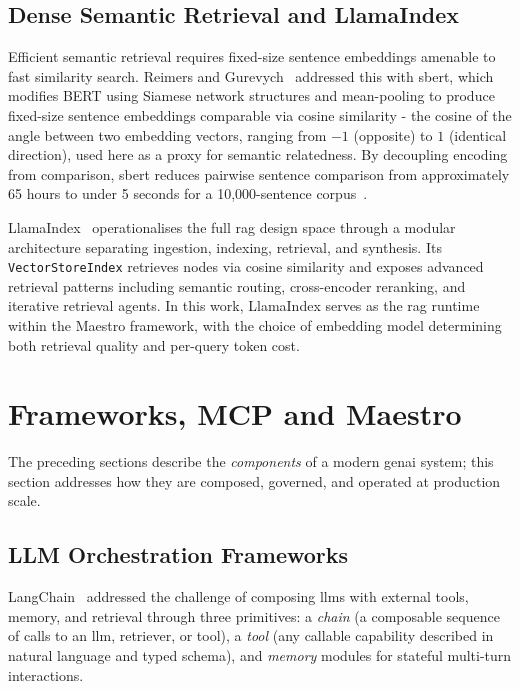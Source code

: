 \subsection{Dense Semantic Retrieval and LlamaIndex}
\label{subsec:sbert}

Efficient semantic retrieval requires fixed-size sentence embeddings amenable to fast similarity search. Reimers and Gurevych~\cite{reimers2019sbert} addressed this with \acrfull{sbert}, which modifies BERT using Siamese network structures and mean-pooling to produce fixed-size sentence embeddings comparable via cosine similarity - the cosine of the angle between two embedding vectors, ranging from $-1$ (opposite) to $1$ (identical direction), used here as a proxy for semantic relatedness. By decoupling encoding from comparison, \gls{sbert} reduces pairwise sentence comparison from approximately 65 hours to under 5 seconds for a 10,000-sentence corpus~\cite{reimers2019sbert}.

LlamaIndex~\cite{liu2022llamaindex} operationalises the full \gls{rag} design space through a modular architecture separating ingestion, indexing, retrieval, and synthesis. Its \texttt{VectorStoreIndex} retrieves nodes via cosine similarity and exposes advanced retrieval patterns including semantic routing, cross-encoder reranking, and iterative retrieval agents. In this work, LlamaIndex serves as the \gls{rag} runtime within the Maestro framework, with the choice of embedding model determining both retrieval quality and per-query token cost.

\section{Frameworks, MCP and Maestro}
\label{sec:orchestration}

The preceding sections describe the \emph{components} of a modern \gls{genai} system; this section addresses how they are composed, governed, and operated at production scale.

\subsection{LLM Orchestration Frameworks}
\label{sec:orchestration-frameworks}

LangChain~\cite{chase2022langchain} addressed the challenge of composing \glspl{llm} with external tools, memory, and retrieval through three primitives: a \textit{chain} (a composable sequence of calls to an \gls{llm}, retriever, or tool), a \textit{tool} (any callable capability described in natural language and typed schema), and \textit{memory} modules for stateful multi-turn interactions.


